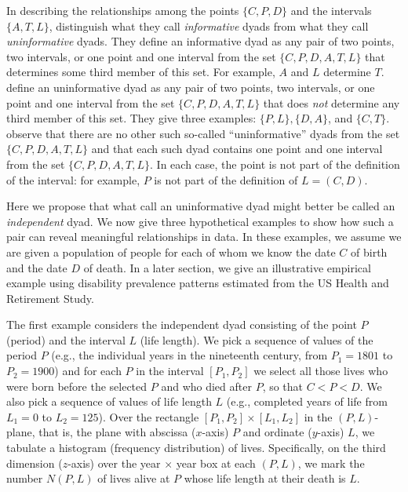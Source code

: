 \documentclass{bmcart}
\begin{document}
In describing the relationships among the points 
$\{C,P,D\}$ and the intervals $\{A,T,L\}$, 
\citet{riffe2017demographictime} distinguish what they call \emph{informative} dyads from what they call \emph{uninformative} dyads. 
They define an informative dyad as any pair of two points, two intervals, or one point and one interval from the set $\{C,P,D,A,T,L\}$
that determines some third member of this set.
For example, $A$ and $L$ determine $T$.
\citet{riffe2017demographictime} define an uninformative dyad as any pair of two points, two intervals, or one point and one interval 
from the set $\{C,P,D,A,T,L\}$ that
does \emph{not} determine any third member of this set. 
They give three examples: $\{P,L\},\{D,A\}$, and $\{C,T\}$.
\citet{riffe2017demographictime} observe that there are no other such so-called 
``uninformative'' dyads from the set $\{C,P,D,A,T,L\}$
and that each such dyad contains one point and one interval from the set $\{C,P,D,A,T,L\}$.
In each case, the point is not part of the definition of the interval: 
for example, $P$ is not part of the definition of $L=(C,D)$.



Here we propose that what \citet{riffe2017demographictime} call an uninformative dyad might better be called
an \emph{independent} dyad.
We now give three hypothetical examples to show how
such a pair can reveal meaningful relationships in data. 
In these examples, we assume we are given a population of people
for each of whom we know the date $C$ of birth and the date $D$ of death.
In a later section,
we give an illustrative empirical example using 
disability prevalence patterns estimated from the US Health and Retirement Study. 


The first example considers the independent dyad consisting of the point $P$ (period)
and the interval $L$ (life length).
We pick a sequence of values of the period $P$ 
(e.g., the individual years in the nineteenth century, from $P_1=1801$ to $P_2=1900$)
and for each $P$ in the interval $[P_1, P_2]$
we select all those lives who were born before the selected $P$ and who died after $P$, 
so that $C<P<D$.
We also pick a sequence of values of life length $L$
(e.g., completed years of life from $L_1=0$ to $L_2=125$).
Over the rectangle $[P_1, P_2] \times [L_1, L_2]$ in the $(P,L)$-plane,
that is, the plane with abscissa ($x$-axis) $P$ and ordinate ($y$-axis) $L$,
we tabulate a histogram (frequency distribution) of lives.
Specifically, on the third dimension ($z$-axis) over the year $\times$ year box at each $(P,L)$,
we mark the number $N(P,L)$ of lives alive at $P$ whose life length at their death is $L$.
\end{document}
